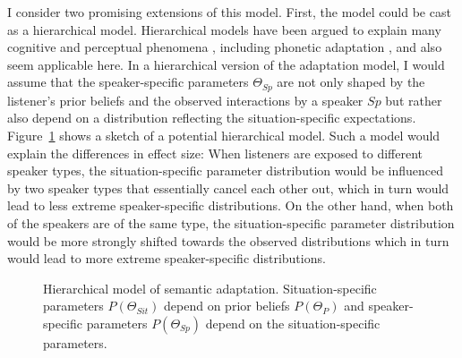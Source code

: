 I consider two promising extensions of this model. First, the model could be cast  as a hierarchical model. 
Hierarchical models
have been argued to explain many cognitive and perceptual phenomena \parencite[see, e.g., ][for a review]{Clark2013}, including
phonetic adaptation \cite{Kleinschmidt2019}, and also seem applicable here. 
In a hierarchical version of the adaptation model, I would assume
that the speaker-specific parameters $\Theta_{Sp}$ are not only shaped by the listener's prior beliefs and 
the observed interactions by a speaker $Sp$ but rather also depend on a distribution reflecting the situation-specific
expectations. Figure~\ref{fig:model} shows a sketch of a potential hierarchical model. Such a model would explain the differences
in effect size: When listeners are exposed to different speaker types, the situation-specific parameter distribution would be influenced
by two speaker types that essentially cancel each other out, which in turn would lead to less extreme speaker-specific distributions. On the other hand, when both
of the speakers are of the same type, the situation-specific parameter distribution would be more strongly shifted towards the observed
distributions which in turn would lead to more extreme speaker-specific distributions.

\begin{figure}
\center
{}
\caption{Hierarchical model of semantic adaptation. Situation-specific parameters $P(\Theta_{Sit})$ depend on prior beliefs $P(\Theta_P)$ and speaker-specific parameters $P(\Theta_{Sp})$ depend on the situation-specific parameters. \label{fig:model}}
\end{figure}



